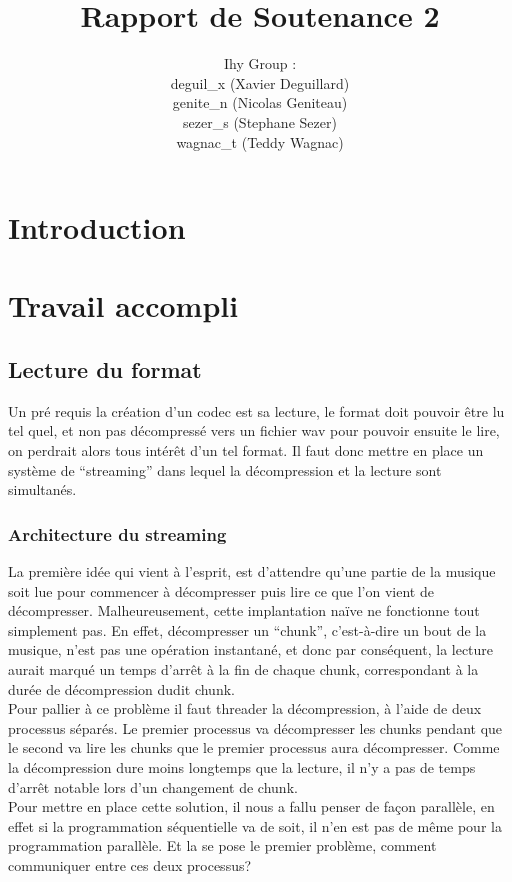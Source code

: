 \documentclass[a4paper,12pt]{article}
\title{Rapport de Soutenance 2}
\author{
Ihy Group : \\
deguil\_x (Xavier Deguillard)\\
genite\_n (Nicolas Geniteau)\\
sezer\_s (Stephane Sezer)\\
wagnac\_t (Teddy Wagnac)
}
\begin{document}
\maketitle

\newpage

\section*{Introduction}

\newpage

\tableofcontents

\newpage

\section{Travail accompli}
	\subsection{Lecture du format}
Un pré requis la création d'un codec est sa lecture, le format doit
pouvoir être lu tel quel, et non pas décompressé vers un fichier wav pour
pouvoir ensuite le lire, on
perdrait alors tous intérêt d'un tel format. Il faut donc mettre en place un
système de ``streaming'' dans lequel la décompression et la lecture sont
simultanés.
		\subsubsection{Architecture du streaming}
La première idée qui vient à l'esprit, est d'attendre qu'une partie de la
musique soit lue pour commencer à décompresser puis lire ce que l'on vient de
décompresser. Malheureusement, cette implantation naïve ne fonctionne tout
simplement pas. En effet, décompresser un ``chunk'', c'est-à-dire un bout de la
musique, n'est pas une opération instantané, et donc par conséquent, la lecture
aurait marqué un temps d'arrêt à la fin de chaque chunk, correspondant à la
durée de décompression dudit chunk.\\
Pour pallier à ce problème il faut threader la décompression, à l'aide de deux
processus séparés. Le premier processus va décompresser les chunks pendant que
le second va lire les chunks que le premier processus aura décompresser. Comme
la décompression dure moins longtemps que la lecture, il n'y a pas de temps
d'arrêt notable lors d'un changement de chunk.\\
Pour mettre en place cette solution, il nous a fallu penser de façon parallèle,
en effet si la programmation séquentielle va de soit, il n'en est pas de même
pour la programmation parallèle. Et la se pose le premier problème, comment
communiquer entre ces deux processus?\\
\end{document}
